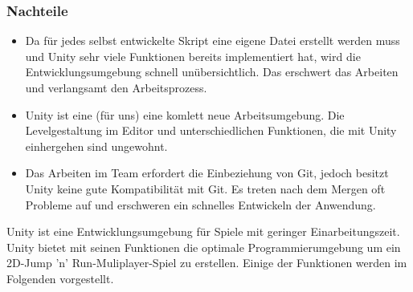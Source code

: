 \subsubsection*{Nachteile}
\begin{itemize}
    \item Da für jedes selbst entwickelte Skript eine eigene Datei erstellt werden muss und Unity sehr viele Funktionen bereits implementiert hat, wird die Entwicklungsumgebung schnell unübersichtlich. Das erschwert das Arbeiten und verlangsamt den Arbeitsprozess.
    \item Unity ist eine (für uns) eine komlett neue Arbeitsumgebung. Die Levelgestaltung im Editor und unterschiedlichen Funktionen, die mit Unity einhergehen sind ungewohnt.
    \item Das Arbeiten im Team erfordert die Einbeziehung von Git, jedoch besitzt Unity keine gute Kompatibilität mit Git. Es treten nach dem Mergen oft Probleme auf und erschweren ein schnelles Entwickeln der Anwendung.
\end{itemize}

Unity ist eine Entwicklungsumgebung für Spiele mit geringer Einarbeitungszeit. Unity bietet mit seinen Funktionen die optimale Programmierumgebung um ein 2D-Jump 'n' Run-Muliplayer-Spiel zu erstellen. Einige der Funktionen werden im Folgenden vorgestellt.


